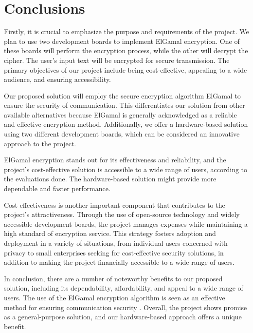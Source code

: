 \documentclass[12pt]{article}
\begin{document}
 		\section{Conclusions}
	
	Firstly, it is crucial to emphasize the purpose and requirements of the project. We plan to use two development boards to implement ElGamal encryption. One of these boards will perform the encryption process, while the other will decrypt the cipher. The user's input text will be encrypted for secure transmission. The primary objectives of our project include being cost-effective, appealing to a wide audience, and ensuring accessibility.\cite{koblitz2012course}

	
	Our proposed solution will employ the secure encryption algorithm ElGamal to ensure the security of communication. This differentiates our solution from other available alternatives because ElGamal is generally acknowledged as a reliable and effective encryption method\cite{mollin2001introduction}. Additionally, we offer a hardware-based solution using two different development boards, which can be considered an innovative approach to the project.
	
	ElGamal encryption stands out for its effectiveness and reliability, and the project's cost-effective solution is accessible to a wide range of users, according to the evaluations done. The hardware-based solution might provide more dependable and faster performance.
	
Cost-effectiveness is another important component that contributes to the project's attractiveness. Through the use of open-source technology and widely accessible development boards, the project manages expenses while maintaining a high standard of encryption service. This strategy fosters adoption and deployment in a variety of situations, from individual users concerned with privacy to small enterprises seeking for cost-effective security solutions, in addition to making the project financially accessible to a wide range of users.
	
In conclusion, there are a number of noteworthy benefits to our proposed solution, including its dependability, affordability, and appeal to a wide range of users. The use of the ElGamal encryption algorithm is seen as an effective method for ensuring communication security	\cite{van1999fundamentals}. Overall, the project shows promise as a general-purpose solution, and our hardware-based approach offers a unique benefit.
	\newpage
\end{document}

